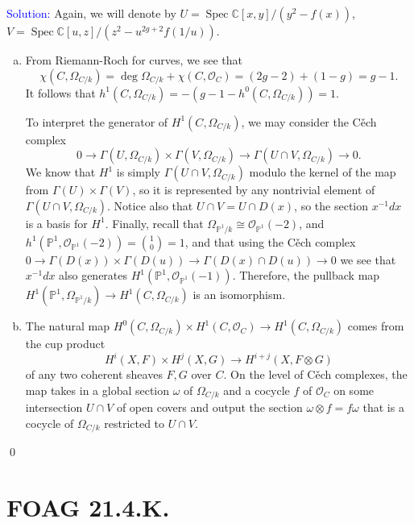 \documentclass[11pt]{article}
\newcommand{\CC}{\mathbb{C}}
\newcommand{\PP}{\mathbb{P}}
\newcommand{\cO}{\mathcal{O}}
\DeclareMathOperator{\Spec}{\operatorname{Spec}}
\newenvironment{solution}{\begin{trivlist}\item[]{\textcolor{blue}{Solution:}}}{\qed \end{trivlist}}
\begin{document}
\begin{solution}
    Again, we will denote by $U = \Spec \CC[x,y]/(y^2 - f(x))$, $V = \Spec \CC[u,z]/(z^2 - u^{2g+2} f(1/u))$. 
    \begin{enumerate}[(a)]
        \item From Riemann-Roch for curves, we see that 
        \[
            \chi(C, \Omega_{C/k}) 
            = \deg \Omega_{C/k} + \chi(C, \cO_C) 
            = (2g - 2) + (1 - g) 
            = g - 1.
        \]
        It follows that $h^1(C, \Omega_{C/k}) = - (g-1 - h^0(C, \Omega_{C/k})) = 1$. 

        To interpret the generator of $H^1(C, \Omega_{C/k})$, we may consider the C\v ech complex 
        \[
            0 
            \longrightarrow \Gamma(U, \Omega_{C/k}) \times \Gamma(V, \Omega_{C/k}) 
            \longrightarrow \Gamma(U \cap V, \Omega_{C/k}) 
            \longrightarrow 0.
        \]
        We know that $H^1$ is simply $\Gamma(U \cap V, \Omega_{C/k})$ modulo the kernel of the map from $\Gamma(U) \times \Gamma(V)$, so it is represented by any nontrivial element of $\Gamma(U \cap V, \Omega_{C/k})$. Notice also that $U \cap V = U \cap D(x)$, so the section $x^{-1} dx$ is a basis for $H^1$. Finally, recall that $\Omega_{\PP^1/k} \cong \cO_{\PP^1}(-2)$, and $h^1(\PP^1, \cO_{\PP^1}(-2)) = \binom{1}{0} = 1$, and that using the C\v ech complex $0 \rightarrow \Gamma(D(x)) \times \Gamma(D(u)) \rightarrow \Gamma(D(x) \cap D(u)) \rightarrow 0$ we see that $x^{-1}dx$ also generates $H^1(\PP^1, \cO_{\PP^1}(-1))$. Therefore, the pullback map $H^1(\PP^1, \Omega_{\PP^1/k}) \rightarrow H^1(C, \Omega_{C/k})$ is an isomorphism. 

        \item The natural map $H^0(C, \Omega_{C/k}) \times H^1(C, \cO_C) \rightarrow H^1(C, \Omega_{C/k})$ comes from the cup product 
        \[
            H^i(X, F) \times H^j(X, G) \longrightarrow H^{i+j}(X, F \otimes G)
        \]
        of any two coherent sheaves $F, G$ over $C$. On the level of C\v ech complexes, the map takes in a global section $\omega$ of $\Omega_{C/k}$ and a cocycle $f$ of $\cO_C$ on some intersection $U \cap V$ of open covers and output the section $\omega \otimes f = f \omega$ that is a cocycle of $\Omega_{C/k}$ restricted to $U \cap V$. 
    \end{enumerate}
\end{solution}

\newpage

\section*{FOAG 21.4.K.}
\end{document}
